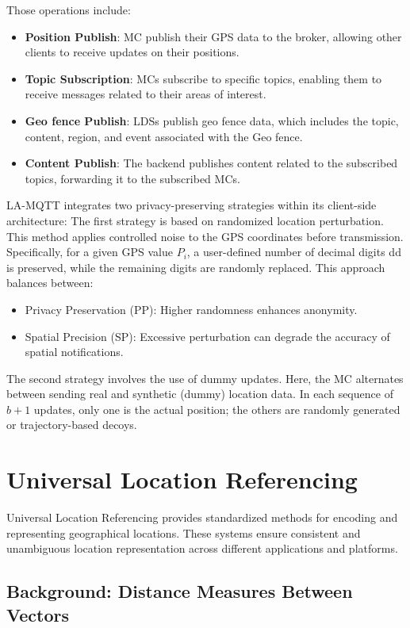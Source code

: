 Those operations include:
\begin{itemize}
    \item \textbf{Position Publish}: MC publish their GPS data to the broker, allowing other clients to receive updates on their positions.
    \item \textbf{Topic Subscription}: MCs subscribe to specific topics, enabling them to receive messages related to their areas of interest.
    \item \textbf{Geo fence Publish}: LDSs publish geo fence data, which includes the topic, content, region, and event associated with the Geo fence.
    \item \textbf{Content Publish}: The backend publishes content related to the subscribed topics, forwarding it to the subscribed MCs.
\end{itemize}

LA-MQTT integrates two privacy-preserving strategies within its client-side architecture:
The first strategy is based on randomized location perturbation. This method applies controlled noise to the GPS coordinates before transmission. Specifically, for a given GPS value $P_i$, a user-defined number of decimal digits dd is preserved, while the remaining digits are randomly replaced. This approach balances between:
\begin{itemize}
    \item Privacy Preservation (PP): Higher randomness enhances anonymity.
    \item Spatial Precision (SP): Excessive perturbation can degrade the accuracy of spatial notifications.
\end{itemize}
The second strategy involves the use of dummy updates. Here, the MC alternates between sending real and synthetic (dummy) location data. In each sequence of $b+1$ updates, only one is the actual position; the others are randomly generated or trajectory-based decoys.

\section{Universal Location Referencing}
Universal Location Referencing provides standardized methods for encoding and representing geographical locations. These systems ensure consistent and unambiguous location representation across different applications and platforms.

\subsection{Background: Distance Measures Between Vectors}
\label{sec:background-distances}

